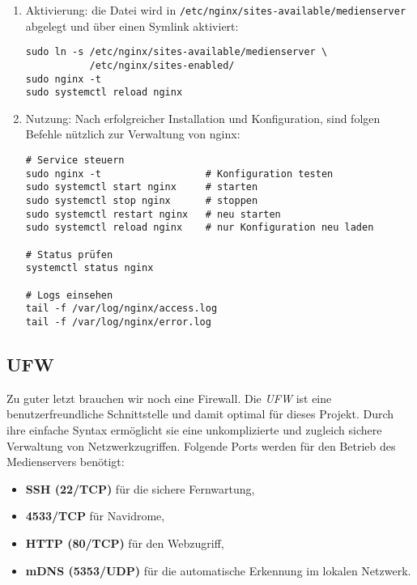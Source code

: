 \documentclass[12pt,a4paper]{report}
\begin{document}
\begin{enumerate}
    \item Aktivierung:
    die Datei wird in \texttt{/etc/nginx/sites-available/medienserver} abgelegt 
    und über einen Symlink aktiviert:  
    \begin{verbatim}
sudo ln -s /etc/nginx/sites-available/medienserver \
           /etc/nginx/sites-enabled/
sudo nginx -t
sudo systemctl reload nginx
    \end{verbatim}  

    \item Nutzung:
    Nach erfolgreicher Installation und Konfiguration, sind folgen Befehle nützlich zur Verwaltung von nginx:
    \begin{verbatim}
# Service steuern
sudo nginx -t                  # Konfiguration testen
sudo systemctl start nginx     # starten
sudo systemctl stop nginx      # stoppen
sudo systemctl restart nginx   # neu starten
sudo systemctl reload nginx    # nur Konfiguration neu laden

# Status prüfen
systemctl status nginx

# Logs einsehen
tail -f /var/log/nginx/access.log
tail -f /var/log/nginx/error.log
    \end{verbatim}
  \end{enumerate}


  \subsection{UFW}
  Zu guter letzt brauchen wir noch eine Firewall. 
  Die \emph{\ac{UFW}} ist eine benutzerfreundliche Schnittstelle und damit optimal für dieses Projekt. 
  Durch ihre einfache Syntax ermöglicht sie eine unkomplizierte und zugleich sichere Verwaltung von Netzwerkzugriffen. 
  Folgende Ports werden für den Betrieb des Medienservers benötigt:
   
  \begin{itemize}
    \item \textbf{\ac{SSH} (22/\ac{TCP})} für die sichere Fernwartung,
    \item \textbf{4533/\ac{TCP}} für Navidrome,
    \item \textbf{\ac{HTTP} (80/\ac{TCP})} für den Webzugriff,
    \item \textbf{\acs{mDNS} (5353/\ac{UDP})} für die automatische Erkennung im lokalen Netzwerk.
  \end{itemize}
\end{document}
